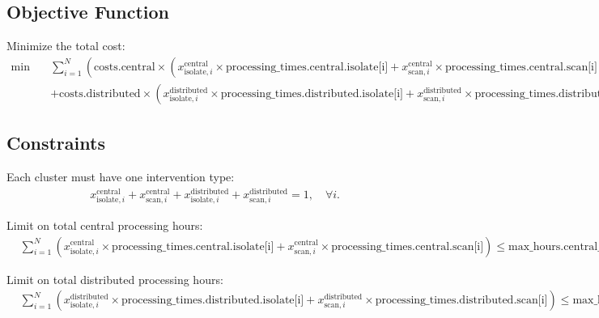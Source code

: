 \documentclass{article}
\begin{document}
\subsection*{Objective Function}
Minimize the total cost:
\begin{align*}
    \min \quad & \sum_{i=1}^{N} \left( \text{costs.central} \times \left( x^{\text{central}}_{\text{isolate}, i} \times \text{processing\_times.central.isolate[i]} + x^{\text{central}}_{\text{scan}, i} \times \text{processing\_times.central.scan[i]} \right) \right. \\
    & \left. + \text{costs.distributed} \times \left( x^{\text{distributed}}_{\text{isolate}, i} \times \text{processing\_times.distributed.isolate[i]} + x^{\text{distributed}}_{\text{scan}, i} \times \text{processing\_times.distributed.scan[i]} \right) \right) 
\end{align*}

\subsection*{Constraints}
Each cluster must have one intervention type:
\begin{align*}
    & x^{\text{central}}_{\text{isolate}, i} + x^{\text{central}}_{\text{scan}, i} + x^{\text{distributed}}_{\text{isolate}, i} + x^{\text{distributed}}_{\text{scan}, i} = 1, \quad \forall i.
\end{align*}

Limit on total central processing hours:
\begin{align*}
    & \sum_{i=1}^{N} \left( x^{\text{central}}_{\text{isolate}, i} \times \text{processing\_times.central.isolate[i]} + x^{\text{central}}_{\text{scan}, i} \times \text{processing\_times.central.scan[i]} \right) \leq \text{max\_hours.central\_max\_hours}
\end{align*}

Limit on total distributed processing hours:
\begin{align*}
    & \sum_{i=1}^{N} \left( x^{\text{distributed}}_{\text{isolate}, i} \times \text{processing\_times.distributed.isolate[i]} + x^{\text{distributed}}_{\text{scan}, i} \times \text{processing\_times.distributed.scan[i]} \right) \leq \text{max\_hours.distributed\_max\_hours}
\end{align*}
\end{document}
